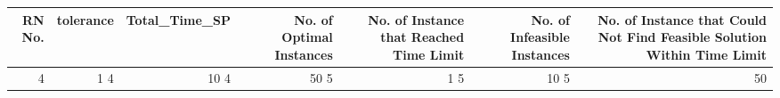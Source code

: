 \begin{tabular}{rrrrrrr}
\toprule
RN No. & tolerance & Total_Time_SP & No. of Optimal Instances & No. of Instance that Reached Time Limit & No. of Infeasible Instances & No. of Instance that Could Not Find Feasible Solution Within Time Limit \\
\midrule
4 & 1%
4 & 10%
4 & 50%
5 & 1%
5 & 10%
5 & 50%
\bottomrule
\end{tabular}
